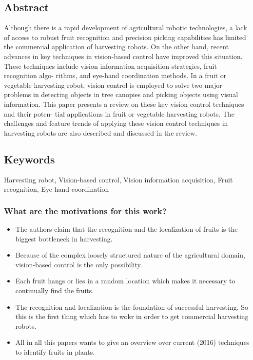     \subsection*{Abstract}
    Although there is a rapid development of agricultural robotic technologies, a lack of access to robust fruit
    recognition and precision picking capabilities has limited the commercial application of harvesting
    robots. On the other hand, recent advances in key techniques in vision-based control have improved this
    situation. These techniques include vision information acquisition strategies, fruit recognition algo-
    rithms, and eye-hand coordination methods. In a fruit or vegetable harvesting robot, vision control is
    employed to solve two major problems in detecting objects in tree canopies and picking objects using
    visual information. This paper presents a review on these key vision control techniques and their poten-
    tial applications in fruit or vegetable harvesting robots. The challenges and feature trends of applying
    these vision control techniques in harvesting robots are also described and discussed in the review.
    
    
    \subsection*{Keywords}
    Harvesting robot, Vision-based control, Vision information acquisition, Fruit recognition, Eye-hand coordination
    
    
     
    \subsubsection*{What are the motivations for this work?}
    \begin{itemize}
        \item The authors claim that the recognition and the localization of fruits is the biggest bottleneck in harvesting.
        \item Because of the complex loosely structured nature of the agricultural domain, vision-based control is the only possibility.
        \item Each fruit hangs or lies in a random location which makes it necessary to continually find the fruits. 
        \item The recognition and localization is the foundation of successful harvesting. So this is the first thing which has to wokr in order to get commercial harvesting robots. 
        \item All in all this papers wants to give an overview over current (2016) techniques to identify fruits in plants.
    \end{itemize}
